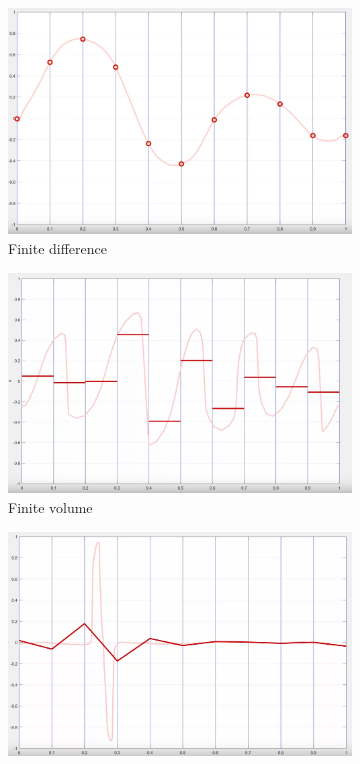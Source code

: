 \begin{figure}
	\centering
	 \begin{subfigure}{.33\textwidth}
      \centering
      \includegraphics[width=0.99\linewidth]{figures/fdm.png}
      \caption{Finite difference}
      \label{fig:fdm}
    \end{subfigure}%
     \begin{subfigure}{.33\textwidth}
      \centering
      \includegraphics[width=.99\linewidth]{figures/fvm.png}
      \caption{Finite volume}
      \label{fig:fvm}
    \end{subfigure}%
	 	 \begin{subfigure}{.33\textwidth}
      \centering
      \includegraphics[width=.99\linewidth]{figures/fem.png}

\end{subfigure}
\end{figure}
